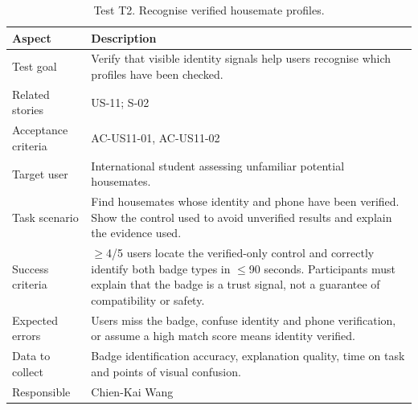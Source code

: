 \documentclass[11pt,a4paper]{article}
\begin{document}
\begin{table}[H]
    \centering
    \small
    \caption{Test T2. Recognise verified housemate profiles.}
    \begin{tabularx}{\textwidth}{@{}L{3.4cm}Y@{}}
        \toprule
        Aspect & Description\\
        \midrule
        Test goal & Verify that visible identity signals help users recognise which profiles have been checked.\\
        Related stories & US-11; S-02\\
        Acceptance criteria & AC-US11-01, AC-US11-02\\
        Target user & International student assessing unfamiliar potential housemates.\\
        Task scenario & Find housemates whose identity and phone have been verified. Show the control used to avoid unverified results and explain the evidence used.\\
        Success criteria & $\geq$4/5 users locate the verified-only control and correctly identify both badge types in $\leq$90 seconds. Participants must explain that the badge is a trust signal, not a guarantee of compatibility or safety.\\
        Expected errors & Users miss the badge, confuse identity and phone verification, or assume a high match score means identity verified.\\
        Data to collect & Badge identification accuracy, explanation quality, time on task and points of visual confusion.\\
        Responsible & Chien-Kai Wang\\
        \bottomrule
    \end{tabularx}
    \label{tabtestt2}
\end{table}
\end{document}
